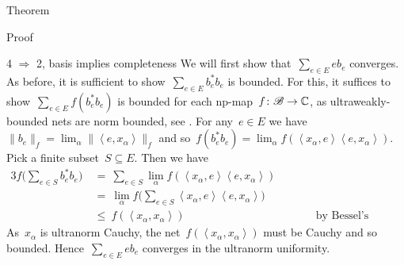 \begin{parsec}
\begin{point}{Theorem}
\begin{point}{Proof}
\begin{point}{4 $\Rightarrow$ 2, basis implies completeness}
We will first show that~$\sum_{e \in E} e b_e$ converges.
As before, it is sufficient to show~$\sum_{e \in E} b_e^*b_e$ is bounded.
For this, it suffices to show~$\sum_{e\in E} f( b_e^*b_e ) $ is bounded
        for each np-map~$f\colon \mathscr{B} \to \mathbb{C}$,
    as ultraweakly-bounded nets are norm bounded,
    see .
For any~$e \in E$
    we have~$\|b_e\|_f = \lim_\alpha \|\left<e,x_\alpha\right>\|_f$
    and so~$f(b_e^*b_e) =\lim_\alpha f(\left<x_\alpha,e\right> \left<e, x_\alpha\right>)$.
    Pick a finite subset~$S \subseteq E$. Then we have
\begin{alignat*}{3}
    f\bigl(\sum_{e \in S} b_e^*b_e\bigr)
    &\ =\  \sum_{e \in S} \lim_\alpha 
     f(\left<x_\alpha,e\right> \left<e, x_\alpha\right>) \\
     &\  = \ \lim_\alpha 
            f\bigl(\sum_{e \in S}\left<x_\alpha,e\right>
                \left<e, x_\alpha\right>\bigr) \\
            &\ \leq\  f(\left<x_\alpha,x_\alpha\right>)
                &\qquad&\text{by Bessel's inequality.}
 \end{alignat*}
As~$x_\alpha$ is ultranorm Cauchy,
the net~$f(\left<x_\alpha,x_\alpha\right>)$
    must be Cauchy and so bounded.
Hence~$\sum_{e \in E} e b_e$ converges in the ultranorm uniformity.


\end{point}
\end{point}
\end{point}
\end{parsec}
